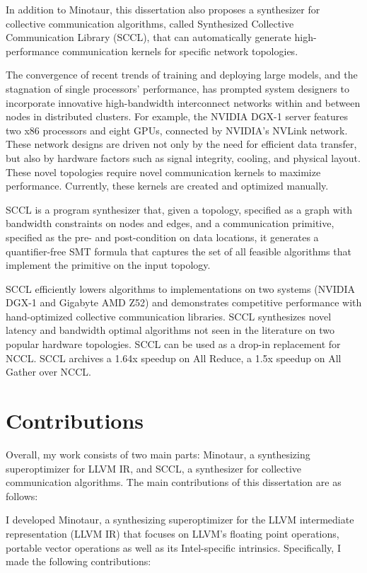 In addition to Minotaur, this dissertation also proposes a synthesizer
for collective communication algorithms, called Synthesized Collective
Communication Library (SCCL), that can automatically generate
high-performance communication kernels for specific network
topologies.

The convergence of recent trends of training and deploying large
models, and the stagnation of single processors' performance, has
prompted system designers to incorporate innovative high-bandwidth
interconnect networks within and between nodes in distributed
clusters.
%
For example, the NVIDIA DGX-1 server features two x86 processors and
eight GPUs, connected by NVIDIA's NVLink network.
%
These network designs are driven not only by the need for efficient
data transfer, but also by hardware factors such as signal integrity,
cooling, and physical layout.
%
These novel topologies require novel communication kernels to maximize
performance.
%
Currently, these kernels are created and optimized manually.

SCCL is a program synthesizer that, given a topology, specified as a
graph with bandwidth constraints on nodes and edges, and a
communication primitive, specified as the pre- and post-condition on
data locations, it generates a quantifier-free SMT formula that
captures the set of all feasible algorithms that implement the
primitive on the input topology.

SCCL efficiently lowers algorithms to implementations on two systems
(NVIDIA DGX-1 and Gigabyte AMD Z52) and demonstrates competitive
performance with hand-optimized collective communication libraries.
SCCL synthesizes novel latency and bandwidth optimal algorithms not
seen in the literature on two popular hardware topologies. SCCL can be
used as a drop-in replacement for NCCL. SCCL archives a 1.64x speedup
on All Reduce, a 1.5x speedup on All Gather over NCCL.



\section{Contributions}

Overall, my work consists of two main parts: Minotaur, a synthesizing
superoptimizer for LLVM IR, and SCCL, a synthesizer for collective
communication algorithms. The main contributions of this dissertation
are as follows:

I developed Minotaur, a synthesizing superoptimizer for the LLVM
intermediate representation (LLVM IR) that focuses on LLVM's floating
point operations, portable vector operations as well as its
Intel-specific intrinsics. Specifically, I made the following
contributions:

